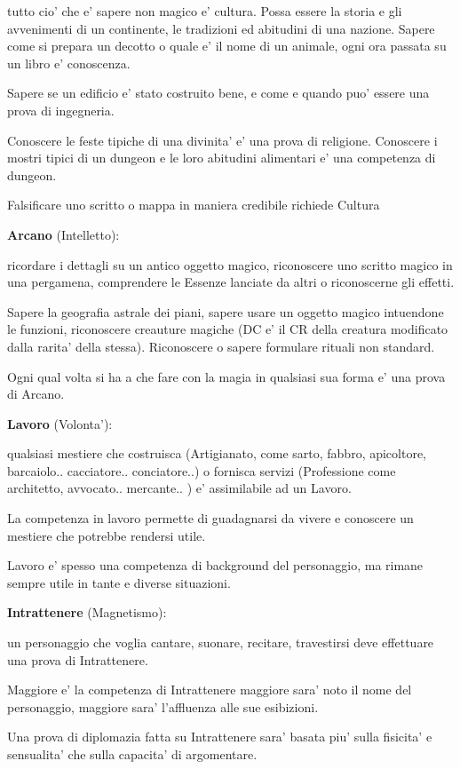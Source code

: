 \documentclass[a4paper,11pt,twoside,openany]{dndbook}
\begin{document}
tutto cio' che e' sapere non magico e' cultura. Possa essere la storia e gli avvenimenti di un continente, le tradizioni ed abitudini di una nazione. Sapere come si prepara un decotto o quale e' il nome di un animale, ogni ora passata su un libro e' conoscenza.

Sapere se un edificio e' stato costruito bene, e come e quando puo' essere una prova di ingegneria.

Conoscere le feste tipiche di una divinita' e' una prova di religione. Conoscere i mostri tipici di un dungeon e le loro abitudini alimentari e' una competenza di dungeon.

Falsificare uno scritto o mappa in maniera credibile richiede Cultura

\textbf{Arcano} (Intelletto):

ricordare i dettagli su un antico oggetto magico, riconoscere uno scritto magico in una pergamena, comprendere le Essenze lanciate da altri o riconoscerne gli effetti.

Sapere la geografia astrale dei piani, sapere usare un oggetto magico intuendone le funzioni, riconoscere creauture magiche (DC e' il CR della creatura modificato dalla rarita' della stessa). Riconoscere o sapere formulare rituali non standard.

Ogni qual volta si ha a che fare con la magia in qualsiasi sua forma e' una prova di Arcano.

\textbf{Lavoro} (Volonta'):

qualsiasi mestiere che costruisca (Artigianato, come sarto, fabbro, apicoltore, barcaiolo.. cacciatore.. conciatore..) o fornisca servizi (Professione come architetto, avvocato.. mercante.. ) e' assimilabile ad un Lavoro.

La competenza in lavoro permette di guadagnarsi da vivere e conoscere un mestiere che potrebbe rendersi utile.

Lavoro e' spesso una competenza di background del personaggio, ma rimane sempre utile in tante e diverse situazioni.

\textbf{Intrattenere} (Magnetismo):

un personaggio che voglia cantare, suonare, recitare, travestirsi deve effettuare una prova di Intrattenere.

Maggiore e' la competenza di Intrattenere maggiore sara' noto il nome del personaggio, maggiore sara' l'affluenza alle sue esibizioni.

Una prova di diplomazia fatta su Intrattenere sara' basata piu' sulla fisicita' e sensualita' che sulla capacita' di argomentare.
\end{document}
